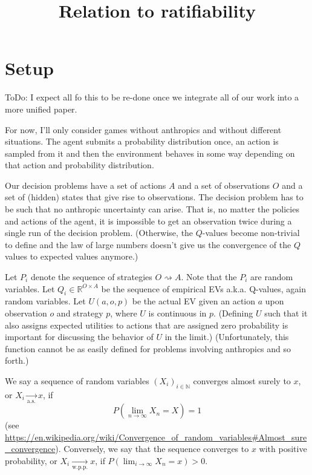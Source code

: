 \documentclass{article}
\title{Relation to ratifiability}
\begin{document}
\maketitle

\section*{Setup}

ToDo: I expect all fo this to be re-done once we integrate all of our work into a more unified paper.

For now, I'll only consider games without anthropics and without different situations. The agent submits a probability distribution once, an action is sampled from it and then the environment behaves in some way depending on that action and probability distribution.

Our decision problems have a set of actions $A$ and a set of observations $O$ and a set of (hidden) states that give rise to observations. The decision problem has to be such that no anthropic uncertainty can arise. That is, no matter the policies and actions of the agent, it is impossible to get an observation twice during a single run of the decision problem. (Otherwise, the $Q$-values become non-trivial to define and the law of large numbers doesn't give us the convergence of the $Q$ values to expected values anymore.)

Let $P_i$ denote the sequence of strategies $O\rightsquigarrow A$. Note that the $P_i$ are random variables. Let $Q_i\in \mathbb{R}^ {O\times A}$ be the sequence of empirical EVs a.k.a. Q-values, again random variables. Let $U(a,o,p)$ be the actual EV given an action $a$ upon observation $o$ and strategy $p$, where $U$ is continuous in $p$. (Defining $U$ such that it also assigns expected utilities to actions that are assigned zero probability is important for discussing the behavior of $U$ in the limit.) (Unfortunately, this function cannot be as easily defined for problems involving anthropics and so forth.)

We say a sequence of random variables $(X_i)_{i\in\mathbb{N}}$ converges almost surely to $x$, or $X_i\underset{\text{a.s.}}{\rightarrow} x$, if
\begin{equation}
P(\lim_{n\rightarrow \infty} X_n = X) = 1
\end{equation}
(see \url{https://en.wikipedia.org/wiki/Convergence_of_random_variables#Almost_sure_convergence}). Conversely, we say that the sequence converges to $x$ with positive probability, or $X_i\underset{\text{w.p.p.}}{\rightarrow} x$, if $P(\lim_{i\rightarrow \infty } X_n = x)>0$.
\end{document}

